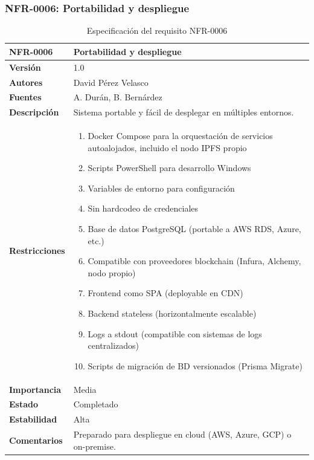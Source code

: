 \documentclass[11pt, a4paper]{article}
\begin{document}
\subsubsection{NFR-0006: Portabilidad y despliegue}

\begin{table}[H]
    \centering
    \small
    \begin{tabular}{|p{4cm}|p{10cm}|}
    \hline
    \textbf{NFR-0006} & Portabilidad y despliegue \\
    \hline
    \textbf{Versión} & 1.0 \\
    \hline
    \textbf{Autores} & David Pérez Velasco \\
    \hline
    \textbf{Fuentes} & A. Durán, B. Bernárdez \\
    \hline
    \textbf{Descripción} & Sistema portable y fácil de desplegar en múltiples entornos. \\
    \hline
    \textbf{Restricciones} & 
    \begin{enumerate}
        \item Docker Compose para la orquestación de servicios autoalojados, incluido el nodo IPFS propio
        \item Scripts PowerShell para desarrollo Windows
        \item Variables de entorno para configuración
        \item Sin hardcodeo de credenciales
        \item Base de datos PostgreSQL (portable a AWS RDS, Azure, etc.)
        \item Compatible con proveedores blockchain (Infura, Alchemy, nodo propio)
        \item Frontend como SPA (deployable en CDN)
        \item Backend stateless (horizontalmente escalable)
        \item Logs a stdout (compatible con sistemas de logs centralizados)
        \item Scripts de migración de BD versionados (Prisma Migrate)
    \end{enumerate} \\
    \hline
    \textbf{Importancia} & Media \\
    \hline
    \textbf{Estado} & Completado \\
    \hline
    \textbf{Estabilidad} & Alta \\
    \hline
    \textbf{Comentarios} & Preparado para despliegue en cloud (AWS, Azure, GCP) o on-premise. \\
    \hline
    \end{tabular}
    \caption{Especificación del requisito NFR-0006}
\end{table}
\end{document}
